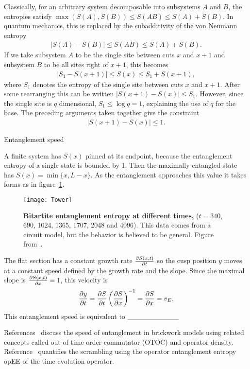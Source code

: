 Classically, for an arbitrary system decomposable into subsystems $A$ and $B$, the entropies satisfy $\max(S(A), S(B)) \leq S(AB)\leq S(A) + S(B)$. In quantum mechanics, this is replaced by the subadditivity of the von Neumann entropy 
\begin{align}
\left|S(A)-S(B)\right| \leq S(AB)\leq S(A) + S(B). \label{eqn:subadd}
\end{align}
If we take subsystem $A$ to be the single site between cuts $x$ and $x+1$ and subsystem $B$ to be all sites right of $x+1$, this becomes
\begin{align}
\left|S_1 - S(x+1)\right| \leq S(x) \leq S_1 + S(x+1),
\end{align}
where $S_1$ denotes the entropy of the single site between cuts $x$ and $x+1$. After some rearranging this can be written $\left|S(x+1) - S(x)\right| \leq S_1$. However, since the single site is $q$ dimensional, $S_1 \leq \log q = 1$, explaining the use of $q$ for the base. The preceding arguments taken together give the constraint
\begin{align}
\left|S(x+1) - S(x)\right| \leq 1. \label{eqn:offbyone}
\end{align}

Entanglement speed

A finite system has $S(x)$ pinned at its endpoint, because the entanglement entropy of a single state is bounded by 1. Then the maximally entangled state has $S(x) = \min\{x,L-x\}$. As the entanglement approaches this value it takes forms as in figure~\ref{fig:Tower}.
\begin{figure}
	\centering
	\texttt{[image: Tower]}
	\caption{\textbf{Bitartite entanglement entropy at different times,} ($t = 340$, 690, 1024, 1365, 1707, 2048 and 4096). This data comes from a circuit model, but the behavior is believed to be general. Figure from~\cite{Nahum2017}.}
	\label{fig:Tower}
\end{figure}
The flat section has a constant growth rate $\frac{\partial S(x,t)}{\partial t}$ so the cusp position $y$ moves at a constant speed defined by the growth rate and the slope. Since the maximal slope is $\frac{\partial S(x,t)}{\partial x}=1$, this velocity is
\begin{align}
\frac{\partial y}{\partial t} = \frac{\partial S}{\partial t}\left(\frac{\partial S}{\partial x}\right)^{-1} = \frac{\partial S}{\partial x} = v_E.
\end{align}
This entanglement speed is equivalent to \_\_\_\_\_\_\_\_\_\_

References~\cite{Keyserlingk, Jonay, Nahum2017} discuss the speed of entanglement in brickwork models using related concepts called out of time order commutator (OTOC) and operator density. Reference~\cite{Zhou2017} quantifies the scrambling using the operator entanglement entropy opEE of the time evolution operator.
